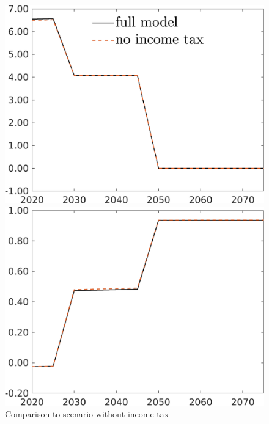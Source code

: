 \begin{figure}[h!!]
	\centering
	\caption{Comparison to scenario without income tax }\label{fig:Compno_taul_BN0}
			\begin{minipage}[]{0.32\textwidth}
		\includegraphics[width=1\textwidth]{../../codding_model/own_basedOnFried/optimalPol_elastS_DisuSci/figures/all_1705/comp_notaul_OPT_T_NoTaus_Emnet_spillover0_sep1_BN0_ineq0_etaa0.79_lgd1.png}
	\end{minipage}
		\begin{minipage}[]{0.32\textwidth}
		\includegraphics[width=1\textwidth]{../../codding_model/own_basedOnFried/optimalPol_elastS_DisuSci/figures/all_1705/comp_notaul_OPT_T_NoTaus_tauf_spillover0_sep1_BN0_ineq0_etaa0.79.png}

\end{minipage}
\end{figure}
